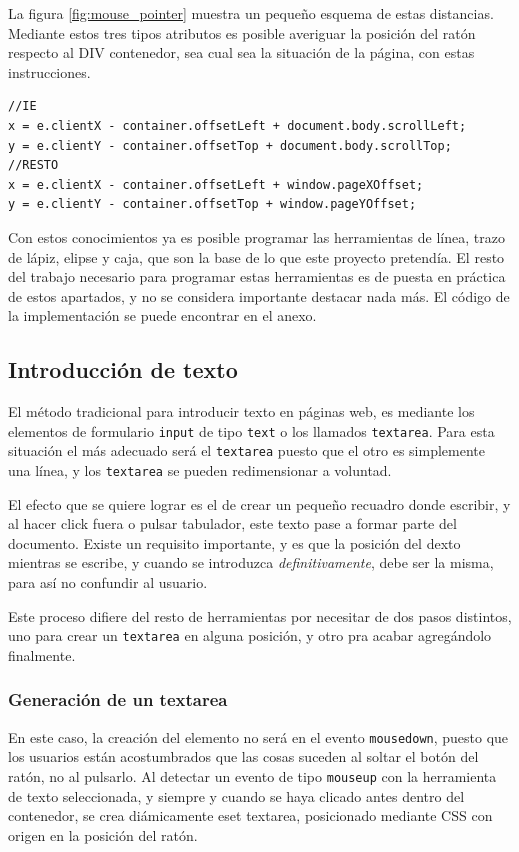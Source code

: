 La figura \ref{fig:mouse_pointer} muestra un pequeño esquema de estas distancias. Mediante estos tres tipos atributos es posible averiguar la posición del ratón respecto al DIV contenedor, sea cual sea la situación de la página, con estas instrucciones.

\begin{verbatim}
//IE
x = e.clientX - container.offsetLeft + document.body.scrollLeft;
y = e.clientY - container.offsetTop + document.body.scrollTop;
//RESTO
x = e.clientX - container.offsetLeft + window.pageXOffset;
y = e.clientY - container.offsetTop + window.pageYOffset;
\end{verbatim}

Con estos conocimientos ya es posible programar las herramientas de línea, trazo de lápiz, elipse y caja, que son la base de lo que este proyecto pretendía. El resto del trabajo necesario para programar estas herramientas es de puesta en práctica de estos apartados, y no se considera importante destacar nada más. El código de la implementación se puede encontrar en el anexo.



\subsection{Introducción de texto} %
\label{sub:introduccion_de_texto}

El método tradicional para introducir texto en páginas web, es mediante los elementos de formulario \texttt{input} de tipo \texttt{text} o los llamados \texttt{textarea}. Para esta situación el más adecuado será el \texttt{textarea} puesto que el otro es simplemente una línea, y los \texttt{textarea} se pueden redimensionar a voluntad.

El efecto que se quiere lograr es el de crear un pequeño recuadro donde escribir, y al hacer click fuera o pulsar tabulador, este texto pase a formar parte del documento. Existe un requisito importante, y es que la posición del dexto mientras se escribe, y cuando se introduzca \emph{definitivamente}, debe ser la misma, para así no confundir al usuario.

Este proceso difiere del resto de herramientas por necesitar de dos pasos distintos, uno para crear un \texttt{textarea} en alguna posición, y otro pra acabar agregándolo finalmente.

\subsubsection{Generación de un textarea} %
\label{ssub:generacion_de_un_textarea}
En este caso, la creación del elemento no será en el evento \texttt{mousedown}, puesto que los usuarios están acostumbrados que las cosas suceden al soltar el botón del ratón, no al pulsarlo. Al detectar un evento de tipo \texttt{mouseup} con la herramienta de texto seleccionada, y siempre y cuando se haya clicado antes dentro del contenedor, se crea diámicamente eset textarea, posicionado mediante CSS con origen en la posición del ratón.

